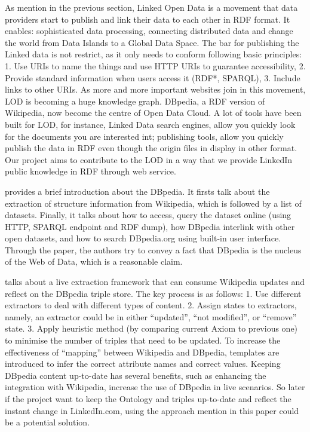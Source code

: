 As mention in the previous section, Linked Open Data is a movement that data providers start to publish and link their data to each other in RDF format. It enables\cite{heath2011linked}: sophisticated data processing, connecting distributed data and change the world from Data Islands to a Global Data Space. The bar for publishing the Linked data is not restrict, as it only needs to conform following basic principles\cite{berners2006design}: 1. Use URIs to name the things and use HTTP URIs to guarantee accessibility, 2. Provide standard information when users access it (RDF*, SPARQL), 3. Include links to other URIs. As more and more important websites join in this movement, LOD is becoming a huge knowledge graph. DBpedia, a	 RDF version of Wikipedia, now become the centre of Open Data Cloud. A lot of tools have been built for LOD\cite{bizer2009}, for instance, Linked Data search engines, allow you quickly look for the documents you are interested int; publishing tools, allow you quickly publish the data in RDF even though the origin files in display in other format. Our project aims to contribute to the LOD in a way  that we provide LinkedIn public knowledge in RDF through web service.

\cite{auer2007} provides a brief introduction about the DBpedia. It firsts talk about the extraction of structure information from Wikipedia, which is followed by a list of datasets. Finally, it talks about how to access, query the dataset online (using HTTP, SPARQL endpoint and RDF dump), how DBpedia interlink with other open datasets, and how to search DBpedia.org using built-in user interface. Through the paper, the authors try to convey a fact that DBpedia is the nucleus of the Web of Data, which is a reasonable claim.

\cite{hellmann2009} talks about a live extraction framework that can consume Wikipedia updates and reflect on the DBpedia triple store. The key process is as follows: 1. Use different extractors to deal with different types of content. 2. Assign states to extractors, namely, an extractor could be in either ``updated'', ``not modified'', or ``remove'' state. 3. Apply heuristic method (by comparing current Axiom to previous one) to minimise the number of triples that need to be updated. To increase the effectiveness of ``mapping'' between Wikipedia and DBpedia, templates are introduced to infer the correct attribute names and correct values. Keeping DBpedia content up-to-date has several benefits, such as enhancing the integration with Wikipedia, increase the use of DBpedia in live scenarios. So later if the project want to keep the Ontology and triples up-to-date and reflect the instant change in LinkedIn.com, using the approach mention in this paper could be a potential solution.


